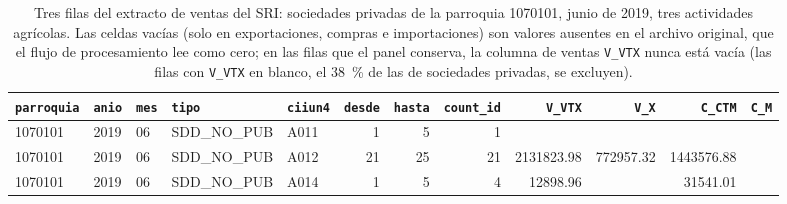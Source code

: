 \documentclass[12pt,a4paper]{article}
\begin{document}
\begin{table}[H]
  \caption[Muestra del extracto de ventas del SRI]{Tres filas del extracto de ventas del SRI: sociedades privadas de la parroquia 1070101, junio de 2019, tres actividades agrícolas. Las celdas vacías (solo en exportaciones, compras e importaciones) son valores ausentes en el archivo original, que el flujo de procesamiento lee como cero; en las filas que el panel conserva, la columna de ventas \texttt{V\_VTX} nunca está vacía (las filas con \texttt{V\_VTX} en blanco, el 38~\% de las de sociedades privadas, se excluyen).}
  \label{tab:muestra}
  \scriptsize
  \setlength{\tabcolsep}{2.5pt}
  \begin{tabular}{|l|l|l|l|l|r|r|r|r|r|r|r|}
    \hline
    \texttt{parroquia} & \texttt{anio} & \texttt{mes} & \texttt{tipo} & \texttt{ciiun4} & \texttt{desde} & \texttt{hasta} & \texttt{count\_id} & \texttt{V\_VTX} & \texttt{V\_X} & \texttt{C\_CTM} & \texttt{C\_M} \\ \hline
    1070101 & 2019 & 06 & SDD\_NO\_PUB & A011 & 1  & 5  & 1  &            &           &            & \\ \hline
    1070101 & 2019 & 06 & SDD\_NO\_PUB & A012 & 21 & 25 & 21 & 2131823.98 & 772957.32 & 1443576.88 & \\ \hline
    1070101 & 2019 & 06 & SDD\_NO\_PUB & A014 & 1  & 5  & 4  & 12898.96   &           & 31541.01   & \\ \hline
  \end{tabular}
\end{table}
\end{document}
